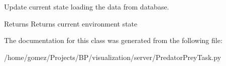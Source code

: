 Update current state loading the data from database. 

\begin{DoxyReturn}{Returns}
Returns current environment state 
\end{DoxyReturn}


The documentation for this class was generated from the following file\+:\begin{DoxyCompactItemize}
\item 
/home/gomez/\+Projects/\+B\+P/visualization/server/Predator\+Prey\+Task.\+py\end{DoxyCompactItemize}
